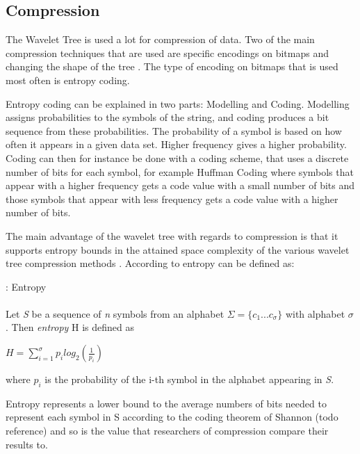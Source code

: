 \subsection{Compression}
The Wavelet Tree is used a lot for compression of data. Two of the main compression techniques that are used are specific encodings on bitmaps and changing the shape of the tree \citep[Section~3]{Navjda13}.
The type of encoding on bitmaps that is used most often is entropy coding.

Entropy coding can be explained in two parts: Modelling and Coding.
Modelling assigns probabilities to the symbols of the string, and coding produces a bit sequence from these probabilities.
The probability of a symbol is based on how often it appears in a given data set. 
Higher frequency gives a higher probability.
Coding can then for instance be done with a coding scheme, that uses a discrete number of bits for each symbol, for example Huffman Coding \citep{HuffmanCoding} where symbols that appear with a higher frequency gets a code value with a small number of bits and those symbols that appear with less frequency gets a code value with a higher number of bits.

The main advantage of the wavelet tree with regards to compression is that it supports entropy bounds in the attained space complexity of the various wavelet tree compression methods \citep[Section~2.1]{WTSurvey}.
According to \citep[Section~1]{WTSurvey} entropy can be defined as:

\begin{mdframed}[nobreak, linecolor=lightgray]
\begin{definition}: Entropy \\\\
Let \textit{S} be a sequence of \textit{n} symbols from an alphabet $\Sigma = \lbrace c_1 ... c_\sigma \rbrace$ with alphabet $\sigma$.
Then \textit{entropy} H is defined as
\begin{center}
$H = \sum_{i=1}^{\sigma} p_i log_2(\frac{1}{p_i})$
\end{center}
where $p_i$ is the probability of the i-th symbol in the alphabet appearing in \textit{S}.
\end{definition} 
\end{mdframed}

Entropy represents a lower bound to the average numbers of bits needed to represent each symbol in S according to the coding theorem of Shannon (todo reference) and so is the value that researchers of compression compare their results to.

